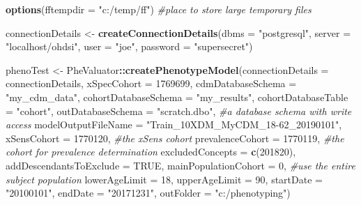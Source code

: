 \documentclass[]{article}
\newenvironment{Shaded}{\begin{snugshade}}{\end{snugshade}}
\newcommand{\CommentTok}[1]{\textcolor[rgb]{0.56,0.35,0.01}{\textit{#1}}}
\newcommand{\DataTypeTok}[1]{\textcolor[rgb]{0.13,0.29,0.53}{#1}}
\newcommand{\DecValTok}[1]{\textcolor[rgb]{0.00,0.00,0.81}{#1}}
\newcommand{\KeywordTok}[1]{\textcolor[rgb]{0.13,0.29,0.53}{\textbf{#1}}}
\newcommand{\NormalTok}[1]{#1}
\newcommand{\OperatorTok}[1]{\textcolor[rgb]{0.81,0.36,0.00}{\textbf{#1}}}
\newcommand{\OtherTok}[1]{\textcolor[rgb]{0.56,0.35,0.01}{#1}}
\newcommand{\StringTok}[1]{\textcolor[rgb]{0.31,0.60,0.02}{#1}}
\begin{document}
\begin{Shaded}
\begin{Highlighting}[]
\KeywordTok{options}\NormalTok{(}\DataTypeTok{fftempdir =} \StringTok{"c:/temp/ff"}\NormalTok{) }\CommentTok{#place to store large temporary files}

\NormalTok{connectionDetails <-}\StringTok{ }\KeywordTok{createConnectionDetails}\NormalTok{(}\DataTypeTok{dbms =} \StringTok{"postgresql"}\NormalTok{,}
                                              \DataTypeTok{server =} \StringTok{"localhost/ohdsi"}\NormalTok{,}
                                              \DataTypeTok{user =} \StringTok{"joe"}\NormalTok{,}
                                              \DataTypeTok{password =} \StringTok{"supersecret"}\NormalTok{)}

\NormalTok{phenoTest <-}\StringTok{ }\NormalTok{PheValuator}\OperatorTok{::}\KeywordTok{createPhenotypeModel}\NormalTok{(}\DataTypeTok{connectionDetails =}\NormalTok{ connectionDetails,}
                           \DataTypeTok{xSpecCohort =} \DecValTok{1769699}\NormalTok{,}
                           \DataTypeTok{cdmDatabaseSchema =} \StringTok{"my_cdm_data"}\NormalTok{,}
                           \DataTypeTok{cohortDatabaseSchema =} \StringTok{"my_results"}\NormalTok{,}
                           \DataTypeTok{cohortDatabaseTable =} \StringTok{"cohort"}\NormalTok{,}
                           \DataTypeTok{outDatabaseSchema =} \StringTok{"scratch.dbo"}\NormalTok{, }\CommentTok{#a database schema with write access}
                           \DataTypeTok{modelOutputFileName =} \StringTok{"Train_10XDM_MyCDM_18-62_20190101"}\NormalTok{,}
                           \DataTypeTok{xSensCohort =} \DecValTok{1770120}\NormalTok{, }\CommentTok{#the xSens cohort}
                           \DataTypeTok{prevalenceCohort =} \DecValTok{1770119}\NormalTok{, }\CommentTok{#the cohort for prevalence determination}
                           \DataTypeTok{excludedConcepts =} \KeywordTok{c}\NormalTok{(}\DecValTok{201820}\NormalTok{), }
                           \DataTypeTok{addDescendantsToExclude =} \OtherTok{TRUE}\NormalTok{,}
                           \DataTypeTok{mainPopulationCohort =} \DecValTok{0}\NormalTok{, }\CommentTok{#use the entire subject population}
                           \DataTypeTok{lowerAgeLimit =} \DecValTok{18}\NormalTok{, }
                           \DataTypeTok{upperAgeLimit =} \DecValTok{90}\NormalTok{,}
                           \DataTypeTok{startDate =} \StringTok{"20100101"}\NormalTok{,}
                           \DataTypeTok{endDate =} \StringTok{"20171231"}\NormalTok{,}
                           \DataTypeTok{outFolder =} \StringTok{"c:/phenotyping"}\NormalTok{)}
\end{Highlighting}
\end{Shaded}
\end{document}
